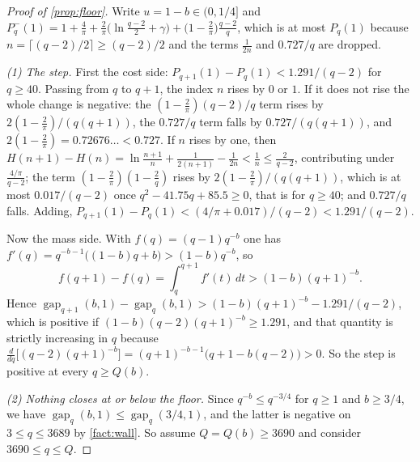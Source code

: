 \documentclass[11pt]{amsart}
\theoremstyle{definition}
\theoremstyle{remark}
\begin{document}
\begin{proof}[Proof of \cref{prop:floor}]
Write $u = 1 - b \in (0, 1/4]$ and $P_q^-(1) = 1 + \frac4\pi + \frac2\pi\bigl(\ln\frac{q-2}{2} + \gamma\bigr) + \bigl(1 - \frac2\pi\bigr)\frac{q-2}{q}$, which is at most $P_q(1)$ because $n = \lceil (q-2)/2\rceil \ge (q-2)/2$ and the terms $\frac{1}{2n}$ and $0.727/q$ are dropped.

\emph{(1) The step.} First the cost side: $P_{q+1}(1) - P_q(1) < 1.291/(q-2)$ for $q \ge 40$. Passing from $q$ to $q+1$, the index $n$ rises by $0$ or $1$. If it does not rise the whole change is negative: the $(1-\frac2\pi)(q-2)/q$ term rises by $2(1-\frac2\pi)/(q(q+1))$, the $0.727/q$ term falls by $0.727/(q(q+1))$, and $2(1-\frac2\pi) = 0.72676\ldots < 0.727$. If $n$ rises by one, then $H(n+1) - H(n) = \ln\frac{n+1}{n} + \frac{1}{2(n+1)} - \frac{1}{2n} < \frac1n \le \frac{2}{q-2}$, contributing under $\frac{4/\pi}{q-2}$; the term $(1-\frac2\pi)(1 - \frac2q)$ rises by $2(1-\frac2\pi)/(q(q+1))$, which is at most $0.017/(q-2)$ once $q^2 - 41.75q + 85.5 \ge 0$, that is for $q \ge 40$; and $0.727/q$ falls. Adding, $P_{q+1}(1) - P_q(1) < (4/\pi + 0.017)/(q-2) < 1.291/(q-2)$.

Now the mass side. With $f(q) = (q-1)q^{-b}$ one has $f'(q) = q^{-b-1}\bigl((1-b)q + b\bigr) > (1-b) q^{-b}$, so
\[
  f(q+1) - f(q) = \int_q^{q+1} f'(t)\,dt > (1-b)(q+1)^{-b} .
\]
Hence $\operatorname{gap}_{q+1}(b,1) - \operatorname{gap}_q(b,1) > (1-b)(q+1)^{-b} - 1.291/(q-2)$, which is positive if $(1-b)(q-2)(q+1)^{-b} \ge 1.291$, and that quantity is strictly increasing in $q$ because $\frac{d}{dq}\bigl[(q-2)(q+1)^{-b}\bigr] = (q+1)^{-b-1}\bigl(q + 1 - b(q-2)\bigr) > 0$. So the step is positive at every $q \ge Q(b)$.

\emph{(2) Nothing closes at or below the floor.} Since $q^{-b} \le q^{-3/4}$ for $q \ge 1$ and $b \ge 3/4$, we have $\operatorname{gap}_q(b,1) \le \operatorname{gap}_q(3/4,1)$, and the latter is negative on $3 \le q \le 3689$ by \cref{fact:wall}. So assume $Q = Q(b) \ge 3690$ and consider $3690 \le q \le Q$.


\end{proof}
\end{document}
